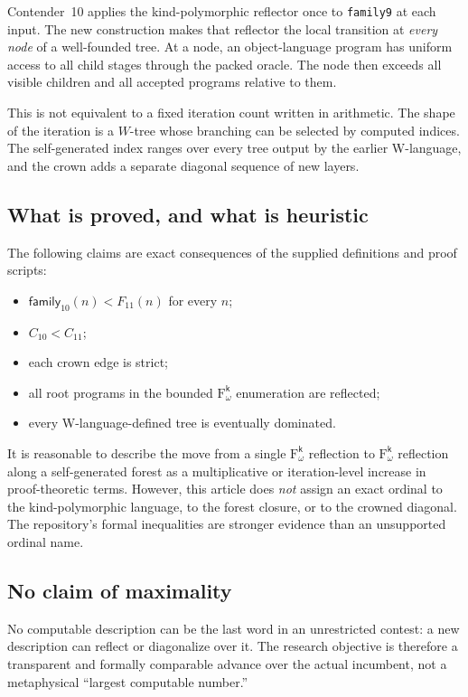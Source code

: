 \documentclass[11pt]{article}
\theoremstyle{definition}
\theoremstyle{remark}
\newcommand{\Fk}{\mathrm{F}_{\omega}^{\mathsf{k}}}
\newcommand{\code}[1]{\texttt{#1}}
\newcommand{\FamTen}{\mathsf{family}_{10}}
\newcommand{\Feleven}{F_{11}}
\newcommand{\ContEleven}{C_{11}}
\newcommand{\ContTen}{C_{10}}
\begin{document}
Contender~10 applies the kind-polymorphic reflector once to \code{family9} at
each input.  The new construction makes that reflector the local transition
at \emph{every node} of a well-founded tree.  At a node, an object-language
program has uniform access to all child stages through the packed oracle.  The
node then exceeds all visible children and all accepted programs relative to
them.

This is not equivalent to a fixed iteration count written in arithmetic.  The
shape of the iteration is a $W$-tree whose branching can be selected by
computed indices.  The self-generated index ranges over every tree output by
the earlier W-language, and the crown adds a separate diagonal sequence of
new layers.

\subsection{What is proved, and what is heuristic}

The following claims are exact consequences of the supplied definitions and
proof scripts:

\begin{itemize}
\item $\FamTen(n)<\Feleven(n)$ for every $n$;
\item $\ContTen<\ContEleven$;
\item each crown edge is strict;
\item all root programs in the bounded $\Fk$ enumeration are reflected;
\item every W-language-defined tree is eventually dominated.
\end{itemize}

It is reasonable to describe the move from a single $\Fk$ reflection to
$\Fk$ reflection along a self-generated forest as a multiplicative or
iteration-level increase in proof-theoretic terms.  However, this article does
\emph{not} assign an exact ordinal to the kind-polymorphic language, to the
forest closure, or to the crowned diagonal.  The repository's formal
inequalities are stronger evidence than an unsupported ordinal name.

\subsection{No claim of maximality}

No computable description can be the last word in an unrestricted contest: a
new description can reflect or diagonalize over it.  The research objective is
therefore a transparent and formally comparable advance over the actual
incumbent, not a metaphysical ``largest computable number.''
\end{document}
